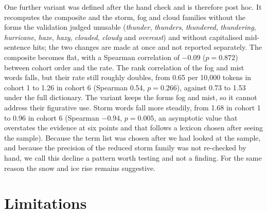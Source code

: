 \documentclass[11pt]{article}
\begin{document}
One further variant was defined after the hand check and is therefore post hoc. It recomputes the composite and the storm, fog and cloud families without the forms the validation judged unusable (\emph{thunder}, \emph{thunders}, \emph{thundered}, \emph{thundering}, \emph{hurricane}, \emph{haze}, \emph{hazy}, \emph{clouded}, \emph{cloudy} and \emph{overcast}) and without capitalised mid-sentence hits; the two changes are made at once and not reported separately. The composite becomes flat, with a Spearman correlation of $-0.09$ ($p=0.872$) between cohort order and the rate.
The rank correlation of the fog and mist words falls, but their rate still roughly doubles, from 0.65 per 10,000 tokens in cohort 1 to 1.26 in cohort 6 (Spearman 0.54, $p=0.266$), against 0.73 to 1.53 under the full dictionary. The variant keeps the forms fog and mist, so it cannot address their figurative use.
Storm words fall more steadily, from 1.68 in cohort 1 to 0.96 in cohort 6 (Spearman $-0.94$, $p=0.005$, an asymptotic value that overstates the evidence at six points and that follows a lexicon chosen after seeing the sample).
Because the term list was chosen after we had looked at the sample, and because the precision of the reduced storm family was not re-checked by hand, we call this decline a pattern worth testing and not a finding. For the same reason the snow and ice rise remains suggestive.

\section{Limitations}
\end{document}
